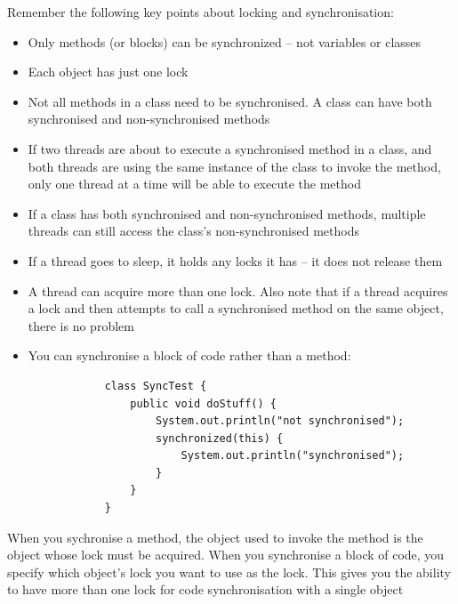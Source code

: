 Remember the following key points about locking and synchronisation:
\begin{itemize}
    \item Only methods (or blocks) can be synchronized -- not variables or 
    classes
    \item Each object has just one lock
    \item Not all methods in a class need to be synchronised. A class can have 
    both synchronised and non-synchronised methods
    \item If two threads are about to execute a synchronised method in a class, 
    and both threads are using the same instance of the class to invoke the 
    method, only one thread at a time will be able to execute the method
    \item If a class has both synchronised and non-synchronised methods, 
    multiple threads can still access the class's non-synchronised methods
    \item If a thread goes to sleep, it holds any locks it has -- it does not 
    release them
    \item A thread can acquire more than one lock. Also note that if a thread 
    acquires a lock and then attempts to call a synchronised method on the same 
    object, there is no problem
    \item You can synchronise a block of code rather than a method:
        \begin{verbatim}
            class SyncTest {
                public void doStuff() {
                    System.out.println("not synchronised");
                    synchronized(this) {
                        System.out.println("synchronised");
                    }
                }
            }
        \end{verbatim}
\end{itemize}

When you sychronise a method, the object used to invoke the method is the 
object whose lock must be acquired. When you synchronise a block of code, you 
specify which object's lock you want to use as the lock. This gives you the 
ability to have more than one lock for code synchronisation with a single 
object

